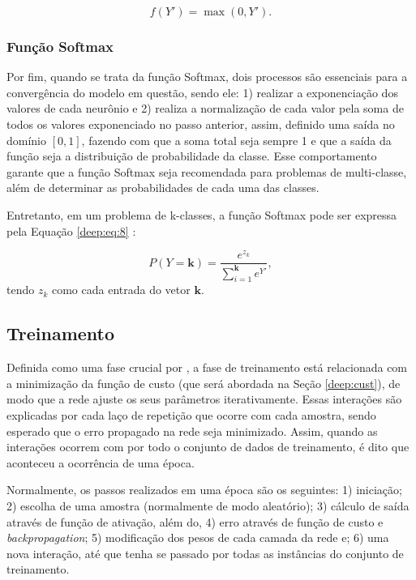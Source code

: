 \begin{equation}
    \label{deep:eq:7}
    f(Y') = \max(0,Y').
\end{equation}

\subsubsection{Função Softmax}
\label{deep:soft}
Por fim, quando se trata da função Softmax, dois processos são essenciais para a convergência do modelo em questão, sendo ele: 1) realizar a exponenciação dos valores de cada neurônio e 2) realiza a normalização de cada valor pela soma de todos os valores exponenciado no passo anterior, assim, definido uma saída no domínio $[0,1]$, fazendo com que a soma total seja sempre 1 \cite{kotu2018data} e que a saída da função seja a distribuição de probabilidade da classe. Esse comportamento garante que a função Softmax seja recomendada para problemas de multi-classe, além de determinar as probabilidades de cada uma das classes.

Entretanto, em um problema de k-classes, a função Softmax pode ser expressa pela Equação \ref{deep:eq:8} \cite{kotu2018data}:

\begin{equation}
    \label{deep:eq:8}
    P(Y = \boldsymbol{k}) = \frac{e^{z_k}}{\sum_{i=1}^{\boldsymbol{k}} e^{Y'}},
\end{equation}
tendo $z_k$ como cada entrada do vetor $\boldsymbol{k}$.


\subsection{Treinamento}
\label{deep:train}

Definida como uma fase crucial por \cite{ponti2018funciona}, a fase de treinamento está relacionada com a minimização da função de custo (que será abordada na Seção \ref{deep:cust}), de modo que a rede ajuste os seus parâmetros iterativamente. Essas interações são explicadas por cada laço de repetição que ocorre com cada amostra, sendo esperado que o erro propagado na rede seja minimizado. Assim, quando as interações ocorrem com por todo o conjunto de dados de treinamento, é dito que aconteceu a ocorrência de uma época.

Normalmente, os passos realizados em uma época são os seguintes: 1) iniciação; 2) escolha de uma amostra (normalmente de modo aleatório); 3) cálculo de saída através de função de ativação, além do, 4) erro através de função de custo e \textit{backpropagation}; 5) modificação dos pesos de cada camada da rede e; 6) uma nova interação, até que tenha se passado por todas as instâncias do conjunto de treinamento.

